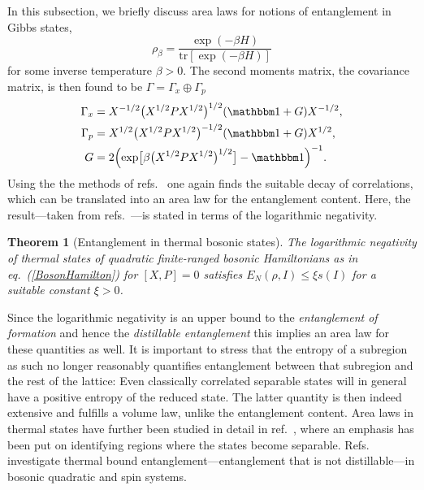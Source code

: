 \documentclass[rmp,twocolumn,floatfix,epsfig,graphics]{revtex4} %
\newtheorem{theorem}{Theorem}
\begin{document}
In this subsection, we briefly discuss area laws for notions of 
entanglement in Gibbs states,
\begin{equation*}
        \rho_\beta=\frac{\exp(-\beta {H})}{\text{tr}[\exp(-\beta {H})]}
\end{equation*}
for some inverse temperature $\beta>0$. The second moments matrix, the 
covariance matrix, is then found to be $\Gamma=\Gamma_x\oplus\Gamma_p$ 
\cite{Area2}
\begin{equation*}
\begin{split}
\Gamma_x&=X^{-1/2}\bigl(X^{1/2}PX^{1/2}\bigr)^{1/2}(\id + G)X^{-1/2},\\
\Gamma_p&=X^{1/2}\bigl(X^{1/2}PX^{1/2}\bigr)^{-1/2}(\id + G)X^{1/2},\\
G&=2\Bigl(\exp\bigl[\beta\bigl(X^{1/2}PX^{1/2}\bigr)^{1/2}\bigr]-\id\Bigr)^{-1}.
\end{split}
\end{equation*}
Using the the methods of refs.\ \cite{Benzi,Area2} one again finds 
the suitable decay of correlations, which can be translated into 
an area law for the entanglement content. Here, the result---taken 
from refs.\ \cite{Area2,Area3}---is stated in terms of the logarithmic 
negativity. 

\begin{theorem}[Entanglement in thermal bosonic states]
The logarithmic 
negativity of thermal states of quadratic finite-ranged
bosonic Hamiltonians as in eq.\ (\ref{BosonHamilton}) for $[X,P]=0$ satisfies
$E_{N}(\rho,I)\leq \xi s(I)$ for a suitable constant $\xi>0$.
\end{theorem}

Since the logarithmic negativity is an upper bound to the
{\it entanglement of formation} and hence the
{\it distillable entanglement} \cite{Horodecki,InHouseReview}
this implies an area law for these quantities as well.
It is important to stress that the entropy of a subregion 
as such no longer reasonably quantifies entanglement between
that subregion and the rest of the lattice: Even classically 
correlated separable states will in general have a positive 
entropy of the reduced state. The latter quantity is then 
indeed extensive and fulfills a volume law, unlike the entanglement 
content. Area laws in thermal states have further been studied 
in detail in ref.\ \cite{Janet}, where an emphasis has been put
on identifying regions where the states become separable.
Refs.\ \cite{AcinThermal,AcinThermal2} 
investigate thermal bound entanglement---entanglement that is not
distillable---in bosonic quadratic and spin systems. 
\end{document}
